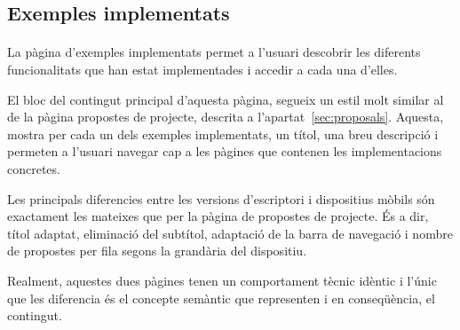 \subsection{Exemples implementats}

    \paragraph{}
    La pàgina d'exemples implementats permet a l'usuari descobrir les diferents fun\-cio\-na\-li\-tats que han estat implementades i accedir a cada una d'elles.

    El bloc del contingut principal d'aquesta pàgina, segueix un estil molt similar al de la pàgina propostes de projecte, descrita a l'apartat~\ref{sec:proposals}. Aquesta, mostra per cada un dels exemples implementats, un títol, una breu descripció i permeten a l'usuari navegar cap a les pàgines que contenen les implementacions concretes.

    Les principals diferencies entre les versions d'escriptori i dispositius mòbils són exactament les mateixes que per la pàgina de propostes de projecte. És a dir, títol adaptat, eliminació del subtítol, adaptació de la barra de navegació i nombre de propostes per fila segons la grandària del dispositiu.

    Realment, aquestes dues pàgines tenen un comportament tècnic idèntic i l'únic que les diferencia és el concepte semàntic que representen i en conseqüència, el contingut.
